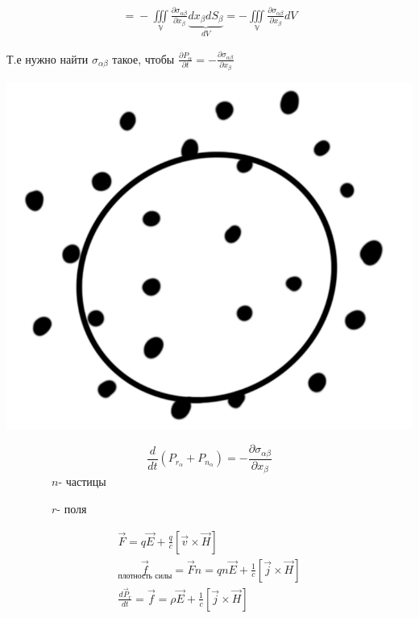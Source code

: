 \begin{gather*}
    \boxed{=} -\underset{\mathbb{V}}{\iiint} \frac{\partial \sigma_{\alpha\beta} }{\partial x_{\beta} } \underbrace{dx_{\beta}dS_{\beta}}_{dV}=
    -\underset{\mathbb{V}}{\iiint}\frac{\partial \sigma_{\alpha\beta} }{\partial x_{\beta} }dV
\end{gather*}

Т.е нужно найти \( \sigma_{\alpha\beta}  \) такое, чтобы \( \frac{\partial P_{\alpha}}{\partial t}=-\frac{\partial \sigma_{\alpha\beta}}{\partial x_{\beta}}   \)

\begin{minipage}[c]{0.4\textwidth} %
    \includegraphics[width=\textwidth]{im/96.png}%
\end{minipage}%
\hfill
\begin{minipage}[c]{0.6\textwidth} %
    \[
    \frac{d}{d t} (P_{r_{\alpha}}+P_{ n_{\alpha}})=-\frac{\partial \sigma_{\alpha\beta}}{\partial x_{\beta}}
    \]
    \( \qquad\qquad n \)- частицы
    
    \(\qquad\qquad r \)- поля 
\end{minipage}

\begin{gather*}
    \vec{F}=q\vec{E}+\frac{q}{c}[\vec{v}\times \vec{H}] \\
    \underset{\text{плотность силы}}{\vec{f}}=\vec{F}n=qn\vec{E}+\frac{1}{c}[\vec{j}\times \vec{H}] \\
    \frac{d\vec{P}_r}{dt}=\vec{f}=\rho\vec{E}+\frac{1}{c}[\vec{j}\times \vec{H}] 
\end{gather*}

